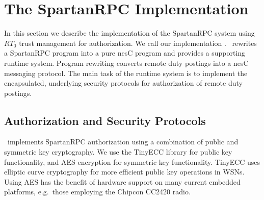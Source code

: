 \begin{comment}
In order to invoke this service the wiring as shown in
\autoref{figure-secure-wire} could be made on the client side. Note the
activation of the necessary credentials, as well as the specification of
client identity as \code{NetB}.

\begin{figure}[!t]
\begin{textbox}{3.0in}
\begin{Verbatim}[fontsize=\small]
enable
  "WSNAdmin.control <- NetB.control, 
    NetB.control    <- NetB" as "NetB"
for 
  ClientC.SamplingRate -> [RemoteSelectorC];
\end{Verbatim}
\end{textbox}
\caption{Security Enabled Dynamic Wire}
\label{figure-secure-wire}
\end{figure}

\end{comment}

\section{The SpartanRPC Implementation}
\label{section-implementation}

In this section we describe the implementation of the SpartanRPC
system using $RT_0$ trust management for authorization. We call our
implementation \Sprocket \cite{sprocket}. \Sprocket\ rewrites a
SpartanRPC program into a pure nesC program and provides a supporting
runtime system. Program rewriting converts remote duty postings into a
nesC messaging protocol. The main task of the runtime system is to
implement the encapsulated, underlying security protocols for
authorization of remote duty postings.

\subsection{Authorization and Security Protocols}
\label{section-security-protocols}
\label{section-underlying-protocols}

\Sprocket\ implements SpartanRPC authorization using a combination of
public and symmetric key cryptography. We use the TinyECC library
\cite{Liu-Peng-TinyECC-2008} for public key functionality, and AES
encryption for symmetric key functionality. TinyECC uses elliptic curve
cryptography for more efficient public key operations in WSNs. Using
AES has the benefit of hardware support on many current embedded
platforms, e.g.~those employing the Chipcon CC2420 radio.


